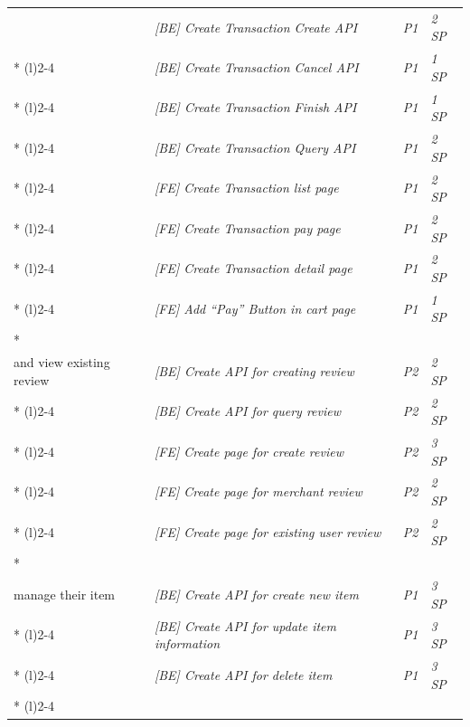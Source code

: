 \documentclass[a4paper]{article}
\begin{document}
\begin{enumerate}
\begin{longtable}{@{}|l|l|l|l|@{}}
 & \textit{{[}BE{]} Create Transaction Create API} & \textit{P1} & \textit{2 SP} \\* \cmidrule(l){2-4}
 & \textit{{[}BE{]} Create Transaction Cancel API} & \textit{P1} & \textit{1 SP} \\* \cmidrule(l){2-4}
 & \textit{{[}BE{]} Create Transaction Finish API} & \textit{P1} & \textit{1 SP} \\* \cmidrule(l){2-4}
 & \textit{{[}BE{]} Create Transaction Query API} & \textit{P1} & \textit{2 SP} \\* \cmidrule(l){2-4}
 & \textit{{[}FE{]} Create Transaction list page} & \textit{P1} & \textit{2 SP} \\* \cmidrule(l){2-4}
 & \textit{{[}FE{]} Create Transaction pay page} & \textit{P1} & \textit{2 SP} \\* \cmidrule(l){2-4}
 & \textit{{[}FE{]} Create Transaction detail page} & \textit{P1} & \textit{2 SP} \\* \cmidrule(l){2-4}
 & \textit{{[}FE{]} Add “Pay” Button in cart page} & \textit{P1} & \textit{1 SP} \\* \midrule
\multirow{5}{*}{\textit{\begin{tabular}[c]{@{}l@{}}User can create review \\ and view existing review\end{tabular}}} & \textit{{[}BE{]} Create API for creating review} & \textit{P2} & \textit{2 SP} \\* \cmidrule(l){2-4}
 & \textit{{[}BE{]} Create API for query review} & \textit{P2} & \textit{2 SP} \\* \cmidrule(l){2-4}
 & \textit{{[}FE{]} Create page for create review} & \textit{P2} & \textit{3 SP} \\* \cmidrule(l){2-4}
 & \textit{{[}FE{]} Create page for merchant review} & \textit{P2} & \textit{2 SP} \\* \cmidrule(l){2-4}
 & \textit{{[}FE{]} Create page for existing user review} & \textit{P2} & \textit{2 SP} \\* \midrule
\multirow{8}{*}{\textit{\begin{tabular}[c]{@{}l@{}}Merchant can \\ manage their item\end{tabular}}} & \textit{{[}BE{]} Create API for create new item} & \textit{P1} & \textit{3 SP} \\* \cmidrule(l){2-4}
 & \textit{{[}BE{]} Create API for update item information} & \textit{P1} & \textit{3 SP} \\* \cmidrule(l){2-4}
 & \textit{{[}BE{]} Create API for delete item} & \textit{P1} & \textit{3 SP} \\* \cmidrule(l){2-4}

\end{longtable}
\end{enumerate}
\end{document}
